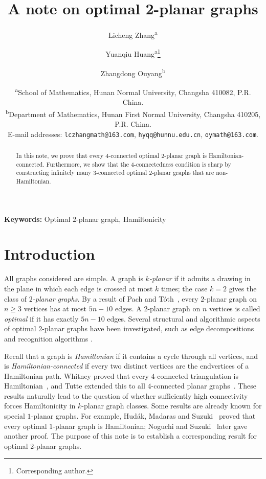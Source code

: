 \documentclass[12pt,a4paper]{article}
\title{\bfseries A note on optimal 2-planar graphs}
\author{
Licheng Zhang\textsuperscript{a}
\and
Yuanqiu Huang\textsuperscript{a}\thanks{Corresponding author.}
\and
Zhangdong Ouyang\textsuperscript{b}
}
\date{\small
\textsuperscript{a}School of Mathematics, Hunan Normal University, Changsha 410082, P.R. China.\\
\textsuperscript{b}Department of Mathematics, Hunan First Normal University, Changsha 410205, P.R. China.\\
E-mail addresses: \texttt{lczhangmath@163.com}, \texttt{hyqq@hunnu.edu.cn}, \texttt{oymath@163.com}.
}
\theoremstyle{plain}
\begin{document}
\maketitle

\begin{abstract}
In this note, we prove that every \(4\)-connected optimal \(2\)-planar graph is Hamiltonian-connected.
Furthermore, we show that the 4-connectedness condition is sharp by constructing infinitely many \(3\)-connected optimal \(2\)-planar graphs that are non-Hamiltonian.
\end{abstract}

\noindent\textbf{Keywords:}  Optimal \(2\)-planar graph, Hamiltonicity

\medskip

\section{Introduction}\label{introsec}
All graphs considered are simple. 
A graph is \emph{\(k\)-planar} if it admits a drawing in the plane in which each edge is crossed at most \(k\) times; the case \(k=2\) gives the class of \emph{\(2\)-planar graphs}.
By a result of Pach and T\'{o}th~\cite{MR1606052}, every \(2\)-planar graph on \(n\ge 3\) vertices has at most \(5n-10\) edges.
A \(2\)-planar graph on \(n\) vertices is called \emph{optimal} if it has exactly \(5n-10\) edges.
 Several structural and algorithmic aspects of optimal \(2\)-planar graphs have been investigated, such as edge decompositions \cite{MR3895013,MR3685688} and recognition algorithms \cite{MR4424763}.
 
Recall that a graph is \emph{Hamiltonian} if it contains a cycle through all vertices, and is \emph{Hamiltonian-connected} if every two distinct vertices are the endvertices of a Hamiltonian path.
Whitney proved that every \(4\)-connected triangulation is Hamiltonian~\cite{MR1503003}, and Tutte extended this to all \(4\)-connected planar graphs~\cite{MR0081471}. 
These results naturally lead to the question of whether sufficiently high connectivity forces Hamiltonicity in \(k\)-planar graph classes. 
Some results are already known for special \(1\)-planar graphs. For example, Hud\'{a}k, Madaras and Suzuki~\cite{MR2993519} proved that every optimal \(1\)-planar graph is Hamiltonian; Noguchi and Suzuki~\cite{MR3417207} later gave another proof. 
The purpose of this note is to establish a corresponding result for optimal \(2\)-planar graphs.  
\end{document}
